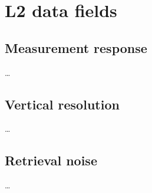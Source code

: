 \section{L2 data fields}
%

\subsection{Measurement response}
\label{sec:mresp}
%
\dots


\subsection{Vertical resolution}
\label{sec:mresp}
%
\dots


\subsection{Retrieval noise}
\label{sec:reterr}
%
\dots






